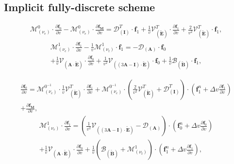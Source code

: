 \documentclass[preprint,12pt]{elsarticle}
\newcommand{\pdv}[2]{\frac{\partial{#1}}{\partial{#2}}}
\newcommand{\vect}[1]{\boldsymbol{#1}}
\newcommand{\matr}[1]{\mathbf{#1}}
\newcommand{\nue}{\nu_{e}}
\newcommand{\nutot}{\nu_{t}}
\newcommand{\vmag}{v}
\newcommand{\tE}{\vect{\tilde{E}}}
\newcommand{\tB}{\vect{\tilde{B}}}
\newcommand{\fM}{f_M}
\newcommand{\vfzero}{\vect{f}_0}
\newcommand{\fone}{\vect{f}_1}
\newcommand{\MI}{\matr{I}}
\newcommand{\MA}{\matr{A}}
\newcommand{\IM}{\boldsymbol{\mathcal{M}}}
\newcommand{\ID}{\boldsymbol{\mathcal{D}}}
\newcommand{\IV}{\boldsymbol{\mathcal{V}}}
\newcommand{\IB}{\boldsymbol{\mathcal{B}}}
\begin{document}
\subsection{Implicit fully-discrete scheme}\label{sec:impl_fullydiscrete_scheme}
\begin{multline}
  \IM^0_{(\nue)} \cdot \pdv{\vfzero}{\vmag} 
  - \IM^0_{(\nue)} \cdot \pdv{\vect{\fM}}{\vmag}
  = 
  \ID^T_{\left(\MI\right)} \cdot \fone
  + \frac{1}{\vmag}\IV^T_{\left(\tE\right)} \cdot 
  \pdv{\fone}{\vmag} 
  + \frac{2}{\vmag^2}\IV^T_{\left(\tE\right)} \cdot \fone ,  
  \label{eq:semiM1hosf0}
\end{multline}
\begin{multline}
  \IM^1_{(\nue)} \cdot \pdv{\fone}{\vmag} 
  - \frac{1}{\vmag}\IM^1_{\left( \nutot \right)} 
  \cdot \fone 
  = 
  - \ID_{\left(\MA\right)}\cdot \vfzero \\ 
  + \frac{1}{\vmag}\IV_{\left(\MA \cdot \tE\right)} \cdot
  \pdv{\vfzero}{\vmag}
  + \frac{1}{\vmag^2}\IV_{\left(\left( 3\MA - \MI \right) \cdot \tE \right)} 
  \cdot \vfzero
  + \frac{1}{\vmag}\IB_{\left( \tB \right)} \cdot \fone ,
  \label{eq:semiM1hosf1}
\end{multline}

\begin{multline}
  \pdv{\vfzero}{\vmag}  
  = 
  \IM^{0^{-1}}_{(\nue)} \cdot \frac{1}{\vmag}\IV^T_{\left(\tE\right)} \cdot 
  \pdv{\fone}{\vmag} 
  + \IM^{0^{-1}}_{(\nue)} \cdot \left(\frac{2}{\vmag^2}\IV^T_{\left(\tE\right)} 
  + \ID^T_{\left(\MI\right)}\right) \cdot  
  \left(\fone^n 
  + \Delta\vmag\pdv{\fone}{\vmag}\right) \\
  + \pdv{\vect{\fM}}{\vmag},  
  \label{eq:semiM1hosf0}
\end{multline}
\begin{multline}
  \IM^1_{(\nue)} \cdot \pdv{\fone}{\vmag}  
  = 
  \left(\frac{1}{\vmag^2}\IV_{\left(\left( 3\MA - \MI \right) \cdot \tE \right)}
  - \ID_{\left(\MA\right)}\right)\cdot \left(\vfzero^n 
  + \Delta\vmag\pdv{\vfzero}{\vmag}\right)\\ 
  + \frac{1}{\vmag}\IV_{\left(\MA \cdot \tE\right)} \cdot
  \pdv{\vfzero}{\vmag}
  + \frac{1}{\vmag}\left(\IB_{\left( \tB \right)} 
  + \IM^1_{\left( \nutot \right)}\right) 
  \cdot \left(\fone^n 
  + \Delta\vmag\pdv{\fone}{\vmag}\right) ,
  \label{eq:semiM1hosf1}
\end{multline}
\end{document}

